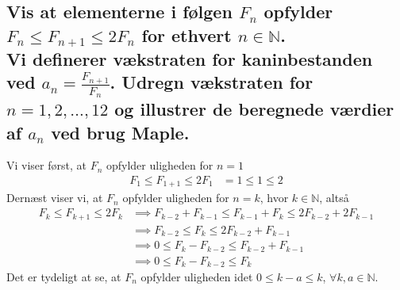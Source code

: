 \documentclass[11pt,a4paper]{article}
\begin{document}
\subsection
{
    \mdseries
    Vis at elementerne i følgen ${F_n}$ opfylder $F_n \leq F_{n+1} \leq 2F_n$
    for ethvert $n \in \mathbb{N}$.
    \\\indent
    Vi definerer vækstraten for kaninbestanden ved $a_n =
    \frac{F_{n+1}}{F_n}$. Udregn vækstraten for $n = 1, 2, \dots, 12$ og
    illustrer de beregnede værdier af $a_n$ ved brug Maple.
}
Vi viser først, at $F_n$ opfylder uligheden for $n=1$
\begin{align}
    F_1 \leq F_{1+1} \leq 2F_1 &= 1 \leq 1 \leq 2
\end{align}
Dernæst viser vi, at $F_n$ opfylder uligheden for $n=k$, hvor $k \in
\mathbb{N}$, altså
\begin{align}
    F_k \leq F_{k+1} \leq 2F_k
    &\implies
    F_{k-2} + F_{k-1} \leq F_{k-1} + F_{k} \leq 2F_{k-2} + 2F_{k-1} \\
    &\implies
    F_{k-2} \leq F_{k} \leq 2F_{k-2} + F_{k-1} \\
    &\implies
    0 \leq F_{k} - F_{k-2} \leq F_{k-2} + F_{k-1} \\
    &\implies
    0 \leq F_{k} - F_{k-2} \leq F_{k}
\end{align}
Det er tydeligt at se, at $F_n$ opfylder uligheden idet $0 \leq k - a \leq k$,
$\forall k, a \in \mathbb{N}$.
\end{document}
